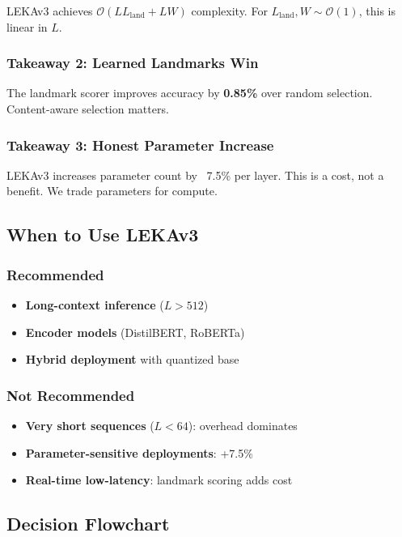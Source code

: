 LEKAv3 achieves $\mathcal{O}(L L_\text{land} + L W)$ complexity. For 
$L_\text{land}, W \sim \mathcal{O}(1)$, this is linear in $L$.

\subsubsection{Takeaway 2: Learned Landmarks Win}

The landmark scorer improves accuracy by \textbf{0.85\%} over random 
selection. Content-aware selection matters.

\subsubsection{Takeaway 3: Honest Parameter Increase}

LEKAv3 increases parameter count by ~7.5\% per layer. This is a cost, not a 
benefit. We trade parameters for compute.

\subsection{When to Use LEKAv3}

\subsubsection{Recommended}
\begin{itemize}
\item \textbf{Long-context inference} ($L > 512$)
\item \textbf{Encoder models} (DistilBERT, RoBERTa)
\item \textbf{Hybrid deployment} with quantized base

\end{itemize}
\subsubsection{Not Recommended}
\begin{itemize}
\item \textbf{Very short sequences} ($L < 64$): overhead dominates
\item \textbf{Parameter-sensitive deployments}: +7.5\%
\item \textbf{Real-time low-latency}: landmark scoring adds cost

\end{itemize}
\subsection{Decision Flowchart}

